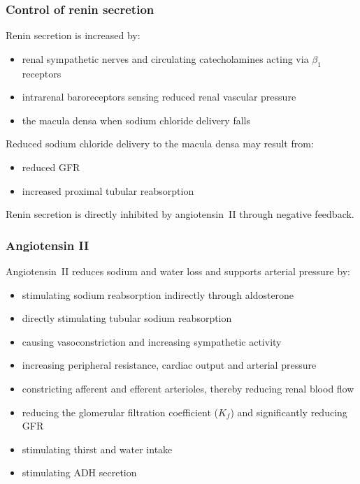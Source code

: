 \documentclass[11pt,a4paper]{article}
\begin{document}
\subsubsection{Control of renin secretion}

Renin secretion is increased by:
\begin{itemize}
    \item renal sympathetic nerves and circulating catecholamines acting via $\beta_{1}$ receptors
    \item intrarenal baroreceptors sensing reduced renal vascular pressure
    \item the macula densa when sodium chloride delivery falls
\end{itemize}

Reduced sodium chloride delivery to the macula densa may result from:
\begin{itemize}
    \item reduced GFR
    \item increased proximal tubular reabsorption
\end{itemize}

Renin secretion is directly inhibited by angiotensin~II through negative feedback.

\subsubsection{Angiotensin II}

Angiotensin~II reduces sodium and water loss and supports arterial pressure by:
\begin{itemize}
    \item stimulating sodium reabsorption indirectly through aldosterone
    \item directly stimulating tubular sodium reabsorption
    \item causing vasoconstriction and increasing sympathetic activity
    \item increasing peripheral resistance, cardiac output and arterial pressure
    \item constricting afferent and efferent arterioles, thereby reducing renal blood flow
    \item reducing the glomerular filtration coefficient ($K_f$) and significantly reducing GFR
    \item stimulating thirst and water intake
    \item stimulating ADH secretion
\end{itemize}
\end{document}
